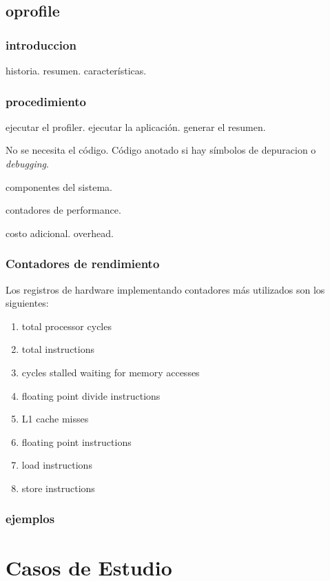 \documentclass[a4paper]{report}
\begin{document}
\section{oprofile}

\subsection{introduccion}

historia. resumen. caracter\'isticas. 

\subsection{procedimiento}

ejecutar el profiler. ejecutar la aplicaci\'on. generar el resumen.

No se necesita el c\'odigo. C\'odigo anotado si hay s\'imbolos de depuracion o {\it debugging}.

componentes del sistema.

contadores de performance.

costo adicional. overhead.

\subsection{Contadores de rendimiento}

Los registros de hardware implementando contadores m\'as utilizados son los siguientes:

\begin{enumerate}
\item total processor cycles
\item total instructions
\item cycles stalled waiting for memory accesses
\item floating point divide instructions
\item L1 cache misses
\item floating point instructions
\item load instructions
\item store instructions
\end{enumerate}

\subsection{ejemplos}

\chapter{Casos de Estudio}
\end{document}
